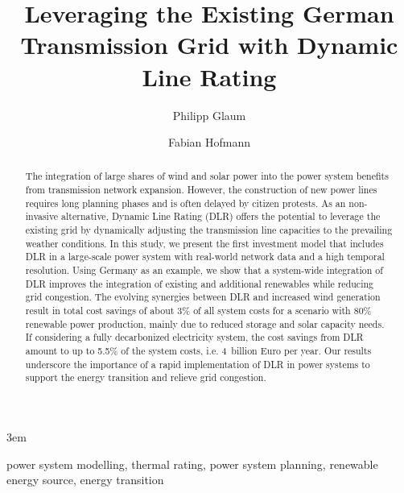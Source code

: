 \documentclass[preprint,12pt]{elsarticle}
\begin{document}
\emergencystretch 3em


\begin{frontmatter}

    \title{Leveraging the Existing German Transmission Grid with Dynamic Line Rating}

    \author[tub]{Philipp Glaum}
    \author[tub]{Fabian Hofmann}


    \begin{abstract}
        The integration of large shares of wind and solar power into the power system benefits from transmission network expansion.
        However, the construction of new power lines requires long planning phases and is often delayed by citizen protests. As an non-invasive alternative, Dynamic Line Rating (DLR) offers the potential to leverage the existing grid by dynamically adjusting the transmission line capacities to the prevailing weather conditions.
        In this study, we present the first investment model  that includes DLR in a large-scale power system with real-world network data and a high temporal resolution.
        Using Germany as an example, we show that a system-wide integration of DLR improves the integration of existing and additional renewables while reducing grid congestion. The evolving synergies between DLR and increased wind generation result in total cost savings of about 3\% of all system costs for a scenario with 80\% renewable power production, mainly due to reduced storage and solar capacity needs. If considering a fully decarbonized electricity system, the cost savings from DLR amount to up to 5.5\% of the system costs, i.e. 4~billion Euro per year. Our results underscore the importance of a rapid implementation of DLR in power systems to support the energy transition and relieve grid congestion.
    \end{abstract}

    \begin{keyword}
        power system modelling, thermal rating, power system planning, renewable energy source, energy transition
    \end{keyword}

\end{frontmatter}
\pagebreak
\end{document}
